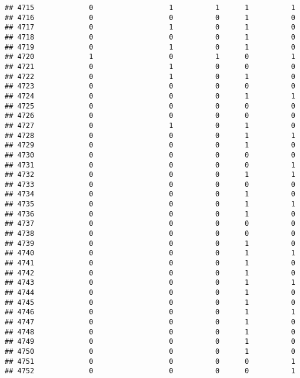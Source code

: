 \documentclass[
]{article}
\begin{document}
\begin{verbatim}
## 4715             0                  1          1      1          1
## 4716             0                  0          0      1          0
## 4717             0                  1          0      1          0
## 4718             0                  0          0      1          0
## 4719             0                  1          0      1          0
## 4720             1                  0          1      0          1
## 4721             0                  1          0      0          0
## 4722             0                  1          0      1          0
## 4723             0                  0          0      0          0
## 4724             0                  0          0      1          1
## 4725             0                  0          0      0          0
## 4726             0                  0          0      0          0
## 4727             0                  1          0      1          0
## 4728             0                  0          0      1          1
## 4729             0                  0          0      1          0
## 4730             0                  0          0      0          0
## 4731             0                  0          0      0          1
## 4732             0                  0          0      1          1
## 4733             0                  0          0      0          0
## 4734             0                  0          0      1          0
## 4735             0                  0          0      1          1
## 4736             0                  0          0      1          0
## 4737             0                  0          0      0          0
## 4738             0                  0          0      0          0
## 4739             0                  0          0      1          0
## 4740             0                  0          0      1          1
## 4741             0                  0          0      1          0
## 4742             0                  0          0      1          0
## 4743             0                  0          0      1          1
## 4744             0                  0          0      1          0
## 4745             0                  0          0      1          0
## 4746             0                  0          0      1          1
## 4747             0                  0          0      1          0
## 4748             0                  0          0      1          0
## 4749             0                  0          0      1          0
## 4750             0                  0          0      1          0
## 4751             0                  0          0      0          1
## 4752             0                  0          0      0          1

\end{verbatim}
\end{document}
